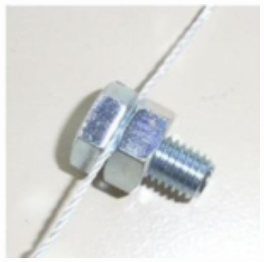 \documentclass[../main.tex]{subfiles}
\begin{document}
\begin{tcolorbox}
\begin{minipage}[]{0.75\textwidth}
\begin{minipage}[]{0.65\textwidth}
        \end{minipage}
        \hspace{0.1cm}
        \begin{minipage}[]{0.3\textwidth}
            \vspace{0.5cm}
            \includegraphics[width=1\textwidth]{img/schraube}
        \end{minipage}


\end{minipage}
\end{tcolorbox}
\end{document}
